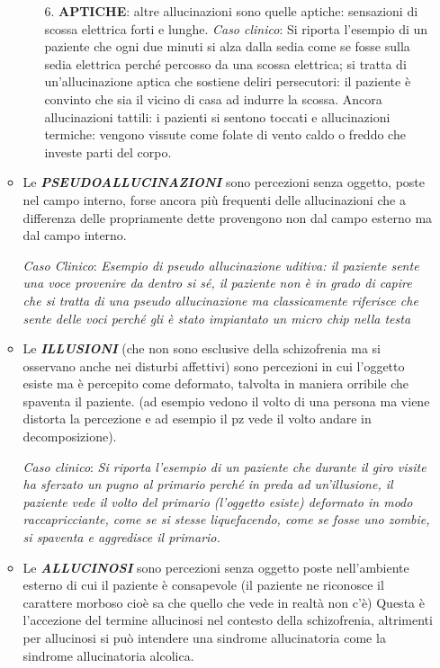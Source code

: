 \begin{itemize}
\begin{itemize}
\begin{itemize}
\item[6.]
  \textbf{APTICHE}: altre allucinazioni sono quelle aptiche: sensazioni
  di scossa elettrica forti e lunghe. \emph{Caso clinico}: Si riporta
  l'esempio di un paziente che ogni due minuti si alza dalla sedia come
  se fosse sulla sedia elettrica perché percosso da una scossa
  elettrica; si tratta di un'allucinazione aptica che sostiene deliri
  persecutori: il paziente è convinto che sia il vicino di casa ad
  indurre la scossa. Ancora allucinazioni tattili: i pazienti si sentono
  toccati e allucinazioni termiche: vengono vissute come folate di vento
  caldo o freddo che investe parti del corpo.
\end{itemize}

\item
  Le \textbf{\emph{PSEUDOALLUCINAZIONI}} sono percezioni senza oggetto,
  poste nel campo interno, forse ancora più frequenti delle
  allucinazioni che a differenza delle propriamente dette provengono non
  dal campo esterno ma dal campo interno.

\emph{Caso Clinico}: \emph{Esempio di pseudo allucinazione uditiva: il
paziente sente una voce provenire da dentro si sé, il paziente non è in
grado di capire che si tratta di una pseudo allucinazione ma
classicamente riferisce che sente delle voci perché gli è stato
impiantato un micro chip nella testa}

\item
  Le \textbf{\emph{ILLUSIONI}} (che non sono esclusive della
  schizofrenia ma si osservano anche nei disturbi affettivi) sono
  percezioni in cui l'oggetto esiste ma è percepito come deformato,
  talvolta in maniera orribile che spaventa il paziente. (ad esempio
  vedono il volto di una persona ma viene distorta la percezione e ad
  esempio il pz vede il volto andare in decomposizione).

\emph{Caso clinico}: \emph{Si riporta l'esempio di un paziente che
durante il giro visite ha sferzato un pugno al primario perché in preda
ad un'illusione, il paziente vede il volto del primario (l'oggetto
esiste) deformato in modo raccapricciante, come se si stesse
liquefacendo, come se fosse uno zombie, si spaventa e aggredisce il
primario. }

\item
  Le \textbf{\emph{ALLUCINOSI}} sono percezioni senza oggetto poste
  nell'ambiente esterno di cui il paziente è consapevole (il paziente ne
  riconosce il carattere morboso cioè sa che quello che vede in realtà
  non c'è) Questa è l'accezione del termine allucinosi nel contesto
  della schizofrenia, altrimenti per allucinosi si può intendere una
  sindrome allucinatoria come la sindrome allucinatoria alcolica.


\end{itemize}
\end{itemize}
